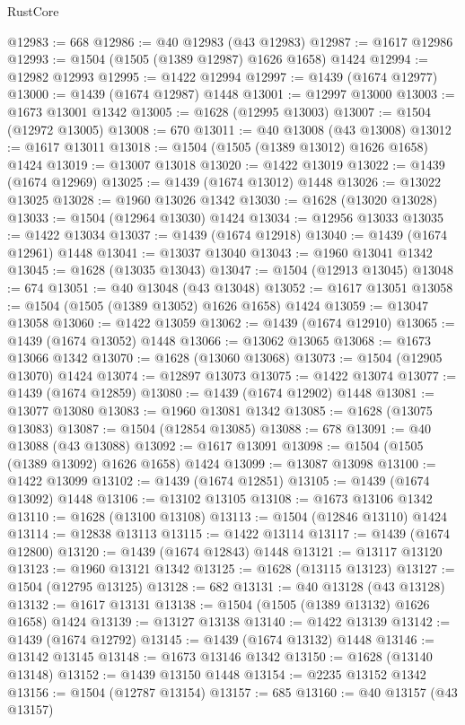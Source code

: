 \begin{lexlean}{RustCore}
\begin{coremodule}
@12983 := 668
@12986 := @40 @12983 (@43 @12983)
@12987 := @1617 @12986
@12993 := @1504 (@1505 (@1389 @12987) @1626 @1658) @1424
@12994 := @12982 @12993
@12995 := @1422 @12994
@12997 := @1439 (@1674 @12977)
@13000 := @1439 (@1674 @12987) @1448
@13001 := @12997 @13000
@13003 := @1673 @13001 @1342
@13005 := @1628 (@12995 @13003)
@13007 := @1504 (@12972 @13005)
@13008 := 670
@13011 := @40 @13008 (@43 @13008)
@13012 := @1617 @13011
@13018 := @1504 (@1505 (@1389 @13012) @1626 @1658) @1424
@13019 := @13007 @13018
@13020 := @1422 @13019
@13022 := @1439 (@1674 @12969)
@13025 := @1439 (@1674 @13012) @1448
@13026 := @13022 @13025
@13028 := @1960 @13026 @1342
@13030 := @1628 (@13020 @13028)
@13033 := @1504 (@12964 @13030) @1424
@13034 := @12956 @13033
@13035 := @1422 @13034
@13037 := @1439 (@1674 @12918)
@13040 := @1439 (@1674 @12961) @1448
@13041 := @13037 @13040
@13043 := @1960 @13041 @1342
@13045 := @1628 (@13035 @13043)
@13047 := @1504 (@12913 @13045)
@13048 := 674
@13051 := @40 @13048 (@43 @13048)
@13052 := @1617 @13051
@13058 := @1504 (@1505 (@1389 @13052) @1626 @1658) @1424
@13059 := @13047 @13058
@13060 := @1422 @13059
@13062 := @1439 (@1674 @12910)
@13065 := @1439 (@1674 @13052) @1448
@13066 := @13062 @13065
@13068 := @1673 @13066 @1342
@13070 := @1628 (@13060 @13068)
@13073 := @1504 (@12905 @13070) @1424
@13074 := @12897 @13073
@13075 := @1422 @13074
@13077 := @1439 (@1674 @12859)
@13080 := @1439 (@1674 @12902) @1448
@13081 := @13077 @13080
@13083 := @1960 @13081 @1342
@13085 := @1628 (@13075 @13083)
@13087 := @1504 (@12854 @13085)
@13088 := 678
@13091 := @40 @13088 (@43 @13088)
@13092 := @1617 @13091
@13098 := @1504 (@1505 (@1389 @13092) @1626 @1658) @1424
@13099 := @13087 @13098
@13100 := @1422 @13099
@13102 := @1439 (@1674 @12851)
@13105 := @1439 (@1674 @13092) @1448
@13106 := @13102 @13105
@13108 := @1673 @13106 @1342
@13110 := @1628 (@13100 @13108)
@13113 := @1504 (@12846 @13110) @1424
@13114 := @12838 @13113
@13115 := @1422 @13114
@13117 := @1439 (@1674 @12800)
@13120 := @1439 (@1674 @12843) @1448
@13121 := @13117 @13120
@13123 := @1960 @13121 @1342
@13125 := @1628 (@13115 @13123)
@13127 := @1504 (@12795 @13125)
@13128 := 682
@13131 := @40 @13128 (@43 @13128)
@13132 := @1617 @13131
@13138 := @1504 (@1505 (@1389 @13132) @1626 @1658) @1424
@13139 := @13127 @13138
@13140 := @1422 @13139
@13142 := @1439 (@1674 @12792)
@13145 := @1439 (@1674 @13132) @1448
@13146 := @13142 @13145
@13148 := @1673 @13146 @1342
@13150 := @1628 (@13140 @13148)
@13152 := @1439 @13150 @1448
@13154 := @2235 @13152 @1342
@13156 := @1504 (@12787 @13154)
@13157 := 685
@13160 := @40 @13157 (@43 @13157)

\end{coremodule}
\end{lexlean}
